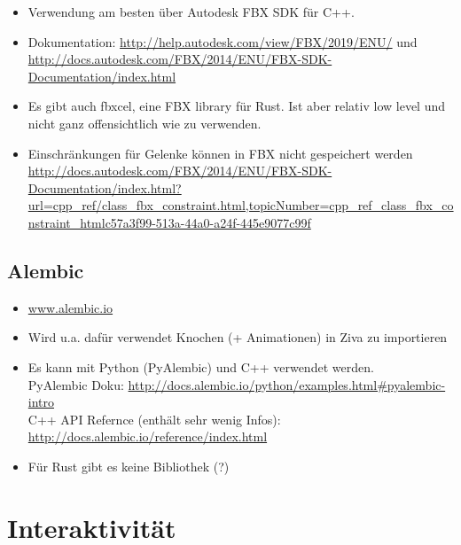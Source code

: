 \begin{itemize}
 \item Verwendung am besten über Autodesk FBX SDK für C++. 
 \item Dokumentation: \url{http://help.autodesk.com/view/FBX/2019/ENU/} und \url{http://docs.autodesk.com/FBX/2014/ENU/FBX-SDK-Documentation/index.html}
 \item Es gibt auch fbxcel, eine FBX library für Rust. Ist aber relativ low level und nicht ganz offensichtlich wie zu verwenden.
 \item Einschränkungen für Gelenke können in FBX nicht gespeichert werden \url{http://docs.autodesk.com/FBX/2014/ENU/FBX-SDK-Documentation/index.html?url=cpp_ref/class_fbx_constraint.html,topicNumber=cpp_ref_class_fbx_constraint_htmlc57a3f99-513a-44a0-a24f-445e9077c99f}
\end{itemize}

\subsection{Alembic}

\begin{itemize}
 \item \url{www.alembic.io}
 \item Wird u.a. dafür verwendet Knochen (+ Animationen) in Ziva zu importieren
 \item Es kann mit Python (PyAlembic) und C++ verwendet werden.\\
 PyAlembic Doku: \url{http://docs.alembic.io/python/examples.html#pyalembic-intro}\\
 C++ API Refernce (enthält sehr wenig Infos): \url{http://docs.alembic.io/reference/index.html}
 \item Für Rust gibt es keine Bibliothek (?)
\end{itemize}


\section{Interaktivität}

